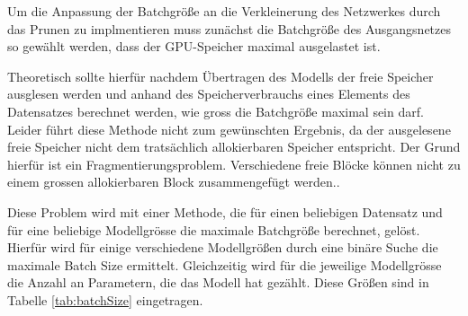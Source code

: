 Um die Anpassung der Batchgröße an die Verkleinerung des Netzwerkes durch das Prunen zu implmentieren muss zunächst die Batchgröße des Ausgangsnetzes so gewählt werden, dass der GPU-Speicher maximal ausgelastet ist.



Theoretisch sollte hierfür nachdem Übertragen des Modells der freie Speicher ausglesen werden und anhand des Speicherverbrauchs eines Elements des Datensatzes berechnet werden, wie gross die Batchgröße maximal sein darf. Leider führt diese Methode nicht zum gewünschten Ergebnis, da der ausgelesene freie Speicher nicht dem tratsächlich allokierbaren Speicher entspricht.
Der Grund hierfür ist ein Fragmentierungsproblem. Verschiedene freie Blöcke können nicht zu einem grossen allokierbaren Block zusammengefügt werden.. 

Diese Problem wird mit einer Methode, die für einen beliebigen Datensatz und für eine beliebige Modellgrösse die maximale Batchgröße berechnet, gelöst. Hierfür wird für einige verschiedene Modellgrößen durch eine binäre Suche die maximale Batch Size ermittelt. Gleichzeitig wird für die jeweilige Modellgrösse die Anzahl an Parametern, die das Modell hat gezählt. Diese Größen sind in Tabelle \ref{tab:batchSize} eingetragen.



